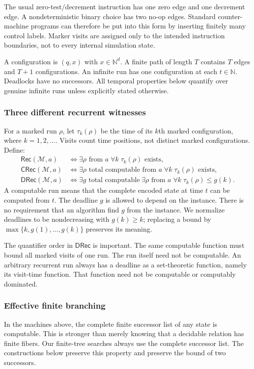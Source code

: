 \documentclass[11pt,letterpaper]{article}
\theoremstyle{definition}
\theoremstyle{remark}
\newcommand{\N}{\mathbb N}
\newcommand{\Rec}{\mathsf{Rec}}
\newcommand{\CRec}{\mathsf{CRec}}
\newcommand{\DRec}{\mathsf{DRec}}
\newcommand{\1}{\mathbf 1}
\newcommand{\M}{\mathcal M}
\begin{document}
The usual zero-test/decrement instruction has one zero edge and one decrement
edge. A nondeterministic binary choice has two no-op edges. Standard
counter-machine programs can therefore be put into this form by inserting
finitely many control labels. Marker visits are assigned only to the intended
instruction boundaries, not to every internal simulation state.

A configuration is $(q,x)$ with $x\in\N^d$. A finite path of length $T$ contains
$T$ edges and $T+1$ configurations. An infinite run has one configuration at
each $t\in\N$. Deadlocks have no successors. All temporal properties below
quantify over genuine infinite runs unless explicitly stated otherwise.

\subsubsection{Three different recurrent witnesses}
For a marked run $\rho$, let $\tau_k(\rho)$ be the time of its $k$th marked
configuration, where $k=1,2,\ldots$. Visits count time positions, not distinct
marked configurations. Define:
\begin{align*}
 \Rec(\M,a)
 &\iff \exists\rho\text{ from }a\;\forall k\;\tau_k(\rho)\text{ exists},\\
 \CRec(\M,a)
 &\iff \exists\rho\text{ total computable from }a\;
                   \forall k\;\tau_k(\rho)\text{ exists},\\
 \DRec(\M,a)
 &\iff \exists g\text{ total computable}\;\exists\rho\text{ from }a\;
                   \forall k\;\tau_k(\rho)\leq g(k).
\end{align*}
A computable run means that the complete encoded state at time $t$ can be
computed from $t$. The deadline $g$ is allowed to depend on the instance.
There is no requirement that an algorithm find $g$ from the instance.
We normalize deadlines to be nondecreasing with $g(k)\geq k$; replacing a
bound by $\max\{k,g(1),\ldots,g(k)\}$ preserves its meaning.

The quantifier order in $\DRec$ is important. The same computable function
must bound all marked visits of one run. The run itself need not be computable.
An arbitrary recurrent run always has a deadline as a set-theoretic function,
namely its visit-time function. That function need not be computable or
computably dominated.

\subsubsection{Effective finite branching}
In the machines above, the complete finite successor list of any state is
computable. This is stronger than merely knowing that a decidable relation has
finite fibers. Our finite-tree searches always use the complete successor
list. The constructions below preserve this property and preserve the bound
of two successors.
\end{document}
